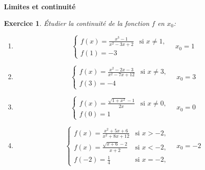 \documentclass[12pt,a4paper]{article}
\theoremstyle{mystyle}
\newtheorem{exo}{Exercice}
\begin{document}
\pagestyle{fancy}
\fancyhf{} %
\fancyfoot[C]{\thepage} %


\begin{center}
    \textbf{\Large Limites et continuité}
\end{center}
\begin{multicols*}{2}



\begin{exo}
Étudier la continuité de la fonction $f$ en $x_0$:

\begin{enumerate}
    \item
    \[
    \begin{cases} 
        f(x) =\displaystyle\frac{x^3 - 1}{x^2 - 3x + 2} & \text{si } x \neq 1, \\
        f(1) = -3 
    \end{cases}
    \quad x_0 = 1
    \]

    \item
    \[
    \begin{cases} 
        f(x) =\displaystyle\frac{x^2 - 2x - 3}{x^2 - 7x + 12} & \text{si } x \neq 3, \\
        f(3) =-4
    \end{cases}
    \quad x_0 = 3
    \]

    \item
    \[
    \begin{cases} 
        f(x) =\displaystyle\frac{\sqrt{1 + x^2} - 1}{2x} & \text{si } x \neq 0, \\
        f(0) =1
    \end{cases}
    \quad x_0 = 0
    \]

    \item
    \[
    \begin{cases} 
        f(x) =\displaystyle\frac{x^2 + 5x + 6}{x^2 + 8x + 12} & \text{si } x > -2, \\
        f(x) =\displaystyle\frac{\sqrt{x + 6} - 2}{x + 2} & \text{si } x < -2, \\
        f(-2) =\displaystyle\frac{1}{4} & \text{si } x = -2,
    \end{cases}
    \quad x_0 = -2
    \]


\end{enumerate}
\end{exo}
\end{multicols*}
\end{document}
